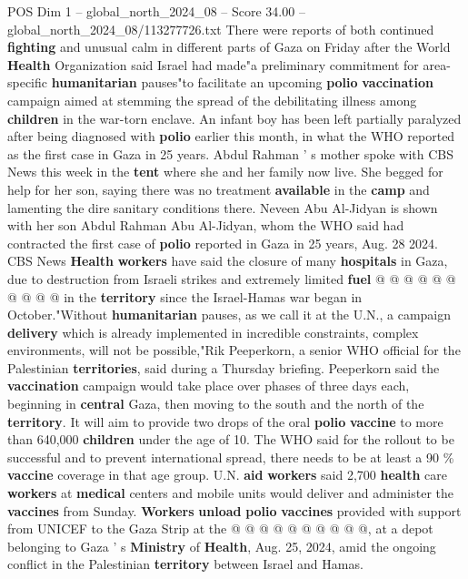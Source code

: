 \begin{textsample}{POS Dim 1 – global\_north\_2024\_08 – Score 34.00 – global\_north\_2024\_08/113277726.txt}  \label{ex:f1_pos_402}
There were reports of both continued \textbf{fighting} and unusual calm in different parts of Gaza on Friday after the World \textbf{Health} Organization said Israel had made"a preliminary commitment for area-specific \textbf{humanitarian} pauses"to facilitate an upcoming \textbf{polio} \textbf{vaccination} campaign aimed at stemming the spread of the debilitating illness among \textbf{children} in the war-torn enclave.
An infant boy has been left partially paralyzed after being diagnosed with \textbf{polio} earlier this month, in what the WHO reported as the first case in Gaza in 25 years.
Abdul Rahman ' s mother spoke with CBS News this week in the \textbf{tent} where she and her family now live.
She begged for help for her son, saying there was no treatment \textbf{available} in the \textbf{camp} and lamenting the dire sanitary conditions there.
Neveen Abu Al-Jidyan is shown with her son Abdul Rahman Abu Al-Jidyan, whom the WHO said had contracted the first case of \textbf{polio} reported in Gaza in 25 years, Aug. 28 2024.
CBS News \textbf{Health} \textbf{workers} have said the closure of many \textbf{hospitals} in Gaza, due to destruction from Israeli strikes and extremely limited \textbf{fuel} @ @ @ @ @ @ @ @ @ @ in the \textbf{territory} since the Israel-Hamas war began in October."Without \textbf{humanitarian} pauses, as we call it at the U.N., a campaign \textbf{delivery} which is already implemented in incredible constraints, complex environments, will not be possible,"Rik Peeperkorn, a senior WHO official for the Palestinian \textbf{territories}, said during a Thursday briefing.
Peeperkorn said the \textbf{vaccination} campaign would take place over phases of three days each, beginning in \textbf{central} Gaza, then moving to the south and the north of the \textbf{territory}.
It will aim to provide two drops of the oral \textbf{polio} \textbf{vaccine} to more than 640,000 \textbf{children} under the age of 10.
The WHO said for the rollout to be successful and to prevent international spread, there needs to be at least a 90 \% \textbf{vaccine} coverage in that age group.
U.N. \textbf{aid} \textbf{workers} said 2,700 \textbf{health} care \textbf{workers} at \textbf{medical} centers and mobile units would deliver and administer the \textbf{vaccines} from Sunday. \textbf{Workers} \textbf{unload} \textbf{polio} \textbf{vaccines} provided with support from UNICEF to the Gaza Strip at the @ @ @ @ @ @ @ @ @ @, at a depot belonging to Gaza ' s \textbf{Ministry} of \textbf{Health}, Aug. 25, 2024, amid the ongoing conflict in the Palestinian \textbf{territory} between Israel and Hamas.

\end{textsample}
